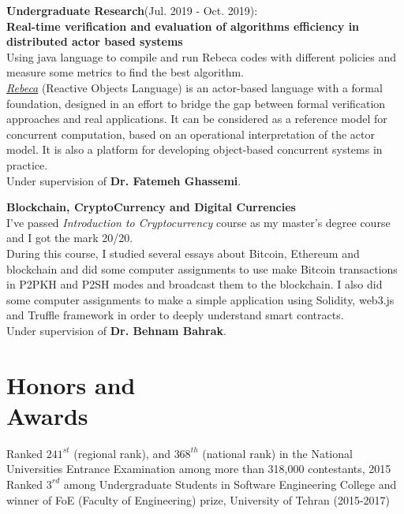 \documentclass[line, mm]{sampleCV}
\begin{document}
\begin{resume}
	\begin{list2}
	
	\item \textbf{َUndergraduate Research}(Jul. 2019 - Oct. 2019): \\
	\textbf{Real-time verification and evaluation of algorithms efficiency in distributed actor based systems}\\
	Using java language to compile and run Rebeca codes with different policies and measure some metrics to find the best algorithm.\\
	\href{http://rebeca-lang.org/}{\textit{Rebeca}} (Reactive Objects Language) is an actor-based language with a formal foundation, designed in an effort to bridge the gap between formal verification approaches and real applications. It can be considered as a reference model for concurrent computation, based on an operational interpretation of the actor model. It is also a platform for developing object-based concurrent systems in practice.\\
	Under supervision of \textbf{Dr. Fatemeh Ghassemi}.
	\\
	\item \textbf{Blockchain, CryptoCurrency and Digital Currencies}	\\
	I've passed \textit{Introduction to Cryptocurrency} course as my master's degree course and I got the mark 20/20. \\ 
	During this course, I studied several essays about Bitcoin, Ethereum and blockchain and did some computer assignments to use make Bitcoin transactions in P2PKH and P2SH modes and broadcast them to the blockchain.
	I also did some computer assignments to make a simple application using Solidity,  web3.js and Truffle framework in order to deeply understand smart contracts.\\
	Under supervision of \textbf{Dr. Behnam Bahrak}.
	\end{list2}



    \section{\mysidestyle Honors and\\Awards} 

   Ranked $241^{st}$ (regional rank), and $368^{th}$ (national rank) in the National Universities Entrance Examination among more than 318,000 contestants, 2015 \\
Ranked $3^{rd}$ among Undergraduate Students in Software Engineering College and winner of FoE (Faculty of Engineering) prize, University of Tehran (2015-2017)\\


\end{resume}
\end{document}
